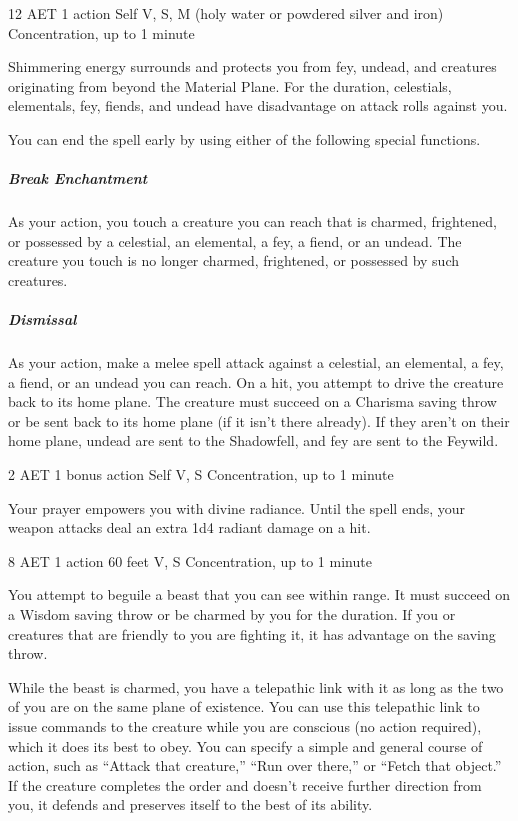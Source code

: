 {12 AET}
{1 action}
{Self}
{V, S, M (holy water or powdered silver and iron)}
{Concentration, up to 1 minute}

Shimmering energy surrounds and protects you from fey, undead, and creatures originating from beyond the Material Plane. For the duration, celestials, elementals, fey, fiends, and undead have disadvantage on attack rolls against you.

You can end the spell early by using either of the following special functions.

\subparagraph*{Break Enchantment} As your action, you touch a creature you can reach that is charmed, frightened, or possessed by a celestial, an elemental, a fey, a fiend, or an undead. The creature you touch is no longer charmed, frightened, or possessed by such creatures.

\subparagraph*{Dismissal} As your action, make a melee spell attack against a celestial, an elemental, a fey, a fiend, or an undead you can reach. On a hit, you attempt to drive the creature back to its home plane. The creature must succeed on a Charisma saving throw or be sent back to its home plane (if it isn't there already). If they aren't on their home plane, undead are sent to the Shadowfell, and fey are sent to the Feywild.


{2 AET}
{1 bonus action}
{Self}
{V, S}
{Concentration, up to 1 minute}

Your prayer empowers you with divine radiance. Until the spell ends, your weapon attacks deal an extra 1d4 radiant damage on a hit.


{8 AET}
{1 action}
{60 feet}
{V, S}
{Concentration, up to 1 minute}

You attempt to beguile a beast that you can see within range. It must succeed on a Wisdom saving throw or be charmed by you for the duration. If you or creatures that are friendly to you are fighting it, it has advantage on the saving throw.

While the beast is charmed, you have a telepathic link with it as long as the two of you are on the same plane of existence. You can use this telepathic link to issue commands to the creature while you are conscious (no action required), which it does its best to obey. You can specify a simple and general course of action, such as “Attack that creature,” “Run over there,” or “Fetch that object.” If the creature completes the order and doesn't receive further direction from you, it defends and preserves itself to the best of its ability.

